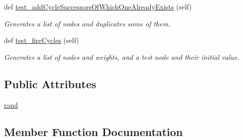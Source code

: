 \begin{DoxyCompactItemize}
def \hyperlink{classNEAT__PyGenetics_1_1NEAT_1_1Tests_1_1SimulationGenomeTests_1_1test__simulationNodes_1_1TestSimulationCycleNode_abba2b6050d0f0b156684d6a8430595c0}{test\+\_\+add\+Cycle\+Successors\+Of\+Which\+One\+Already\+Exists} (self)
\begin{DoxyCompactList}\small\item\em Generates a list of nodes and duplicates some of them. \end{DoxyCompactList}\item 
def \hyperlink{classNEAT__PyGenetics_1_1NEAT_1_1Tests_1_1SimulationGenomeTests_1_1test__simulationNodes_1_1TestSimulationCycleNode_ab3d073cdf68857190769fd380b63b842}{test\+\_\+fire\+Cycles} (self)
\begin{DoxyCompactList}\small\item\em Generates a list of nodes and weights, and a test node and their initial value. \end{DoxyCompactList}\end{DoxyCompactItemize}
\subsection*{Public Attributes}
\begin{DoxyCompactItemize}
\item 
\hyperlink{classNEAT__PyGenetics_1_1NEAT_1_1Tests_1_1SimulationGenomeTests_1_1test__simulationNodes_1_1TestSimulationCycleNode_a0ad6f4a80ac5521840deb8b91dde6020}{rand}
\end{DoxyCompactItemize}


\subsection{Member Function Documentation}
